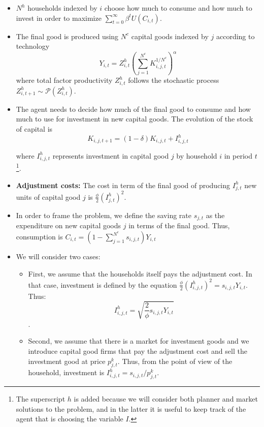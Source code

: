 \documentclass[11pt]{article}
\numberwithin{equation}{section}
\begin{document}
\begin{itemize}
	\item $N^h$ households indexed by $i$ choose how much to consume and how much to invest in order to maximize $\sum_{t=0}^{\infty} \beta^t U(C_{i,t})$.\medskip
	
	\item The final good is produced using $N^c$ capital goods indexed by $j$ according to technology $$Y_{i,t}=Z^h_{i,t} \left(\sum_{j=1}^{N^c} K_{i,j,t}^{1/N^c} \right)^{\alpha}$$  where total factor productivity $Z^h_{i,t}$ follows the stochastic process $Z^h_{i,t+1} \sim \mathcal P(Z^h_{i,t})$. \medskip
	
	\item The agent needs to decide how much of the final good to consume and how much to use for investment in new capital goods. The evolution of the stock of capital is $$K_{i,j,t+1} = (1-\delta) K_{i,j,t} + I^h_{i,j,t}$$ \medskip
	
	where $I^h_{i,j,t}$ represents investment in capital good $j$ by household $i$ in period $t$\footnote{The superscript $h$ is added because we will consider both planner and market solutions to the problem, and in the latter it is useful to keep track of the agent that is choosing the variable $I$.}. 
	
	\item \textbf{Adjustment costs:} The cost in term of the final good of  producing $I^h_{j,t}$ new units of capital good $j$  is $\frac{\phi}{2} \left(I^h_{j,t}\right)^2$.  \medskip
	
	\item In order to frame the problem, we define the saving rate $s_{j,t}$ as the expenditure on new capital goods $j$ in terms of the final good. Thus, consumption is $C_{i,t}=(1-\sum_{j=1}^{N^c} s_{i,j,t})Y_{i,t}$ 
	
	\item We will consider two cases: 
	
	\begin{itemize}
		\item First, we assume that the households itself pays the adjustment cost. In that case, investment is defined by the equation $\frac{\phi}{2} \left(I^h_{i,j,t}\right)^2 = s_{i,j,t} Y_{i,t}$. Thus: $$I^h_{i,j,t} = \sqrt{\frac{2}{\phi} s_{i,j,t} Y_{i,t}}$$. \medskip
		\item Second, we assume that there is a market for investment goods and we introduce capital good firms that pay the adjustment cost and sell the investment good at price $p^k_{j,t}$. Thus, from the point of view of the household, investment is $I^h_{i,j,t} = s_{i,j,t}/p^k_{j,t}$.   \medskip
	\end{itemize}  
\end{itemize}
\end{document}
